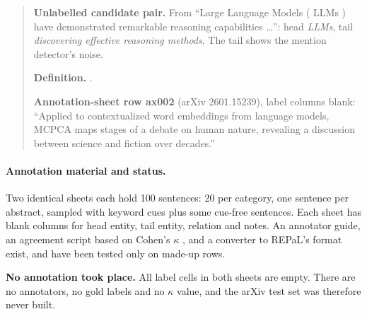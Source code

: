 \begin{quote}\small
\textbf{Unlabelled candidate pair.} From ``Large Language Models ( LLMs ) have demonstrated remarkable reasoning capabilities \ldots'': head \emph{LLMs}, tail \emph{discovering effective reasoning methods}. The tail shows the mention detector's noise.

\textbf{Definition.} .

\textbf{Annotation-sheet row ax002} (arXiv 2601.15239), label columns blank: ``Applied to contextualized word embeddings from language models, MCPCA maps stages of a debate on human nature, revealing a discussion between science and fiction over decades.''
\end{quote}

\paragraph{Annotation material and status.} Two identical sheets each hold 100 sentences: 20 per category, one sentence per abstract, sampled with keyword cues plus some cue-free sentences. Each sheet has blank columns for head entity, tail entity, relation and notes. An annotator guide, an agreement script based on Cohen's $\kappa$ \citep{cohen1960coefficient}, and a converter to REPaL's format exist, and have been tested only on made-up rows.

\textbf{No annotation took place.} All label cells in both sheets are empty. There are no annotators, no gold labels and no $\kappa$ value, and the arXiv test set was therefore never built.
